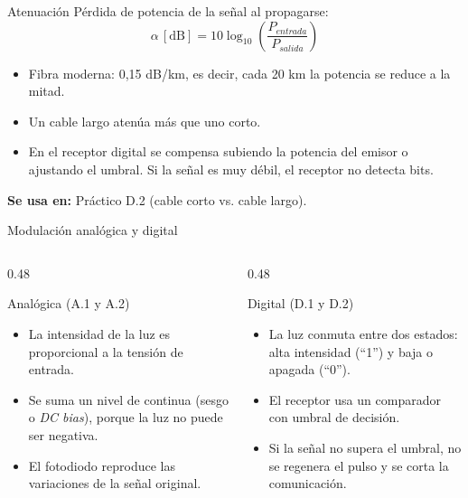 \documentclass[aspectratio=169,10pt]{beamer}
\begin{document}
\begin{frame}{Atenuación}
  Pérdida de potencia de la señal al propagarse:
  \[
    \alpha\,[\mathrm{dB}] = 10 \log_{10}\!\left(\frac{P_{entrada}}{P_{salida}}\right)
  \]

  \begin{itemize}
    \item Fibra moderna: 0,15 dB/km, es decir, cada 20 km la potencia se reduce a la mitad.
    \item Un cable {largo} atenúa más que uno {corto}.
    \item En el receptor digital se compensa subiendo la potencia del emisor o ajustando el umbral. Si la señal es muy débil, el receptor no detecta bits.
  \end{itemize}

  \medskip
  \textbf{Se usa en:} Práctico D.2 (cable corto vs. cable largo).
\end{frame}

\begin{frame}{Modulación analógica y digital}
  \begin{columns}[T]
    \begin{column}{0.48\textwidth}
      \begin{block}{Analógica (A.1 y A.2)}
        \begin{itemize}
          \item La intensidad de la luz es {proporcional} a la tensión de entrada.
          \item Se suma un nivel de continua (sesgo o \emph{DC bias}), porque la luz no puede ser negativa.
          \item El fotodiodo reproduce las variaciones de la señal original.
        \end{itemize}
      \end{block}
    \end{column}
    \begin{column}{0.48\textwidth}
      \begin{block}{Digital (D.1 y D.2)}
        \begin{itemize}
          \item La luz conmuta entre dos estados: alta intensidad (``1'') y baja o apagada (``0'').
          \item El receptor usa un {comparador con umbral de decisión}.
          \item Si la señal no supera el umbral, no se regenera el pulso y se corta la comunicación.
        \end{itemize}
      \end{block}
    \end{column}
  \end{columns}
\end{frame}
\end{document}
